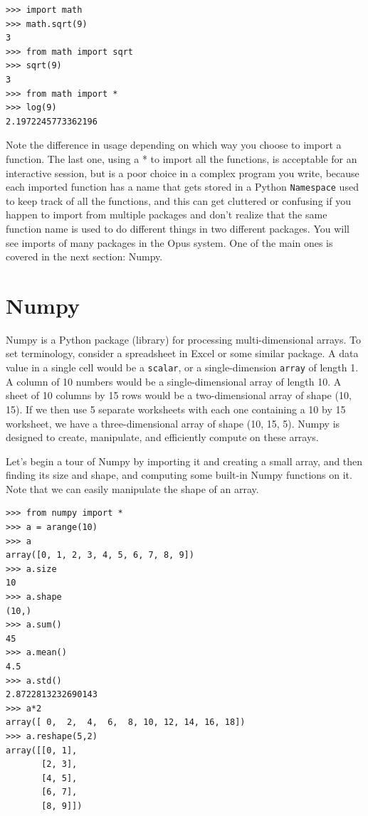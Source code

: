 \begin{lstlisting}
>>> import math
>>> math.sqrt(9)
3
>>> from math import sqrt
>>> sqrt(9)
3
>>> from math import *
>>> log(9)
2.1972245773362196
\end{lstlisting}

Note the difference in usage depending on which way you choose to import a function.  The last one, using a * to import all the functions, is acceptable for an interactive session, but is a poor choice in a complex program you write, because each imported function has a name that gets stored in a Python \verb#Namespace# used to keep track of all the functions, and this can get cluttered or confusing if you happen to import from multiple packages and don't realize that the same function name is used to do different things in two different packages. You will see imports of many packages in the Opus system.  One of the main ones is covered in the next section: Numpy.


\section{Numpy}
\label{appendix:numpy}

Numpy is a Python package (library) for processing multi-dimensional arrays.  To set terminology, consider a spreadsheet in Excel or some similar package.  A data value in a single cell would be a \verb#scalar#, or a single-dimension \verb#array# of length 1.  A column of 10 numbers would be a single-dimensional array of length 10.  A sheet of 10 columns by 15 rows would be a two-dimensional array of shape (10, 15).  If we then use 5 separate worksheets with each one containing a 10 by 15 worksheet, we have a three-dimensional array of shape (10, 15, 5).  Numpy is designed to create, manipulate, and efficiently compute on these arrays.

Let's begin a tour of Numpy by importing it and creating a small array,  and then finding its size and shape, and computing some built-in Numpy functions on it. Note that we can easily manipulate the shape of an array.

\begin{lstlisting}
>>> from numpy import *
>>> a = arange(10)
>>> a
array([0, 1, 2, 3, 4, 5, 6, 7, 8, 9])
>>> a.size
10
>>> a.shape
(10,)
>>> a.sum()
45
>>> a.mean()
4.5
>>> a.std()
2.8722813232690143
>>> a*2
array([ 0,  2,  4,  6,  8, 10, 12, 14, 16, 18])
>>> a.reshape(5,2)
array([[0, 1],
       [2, 3],
       [4, 5],
       [6, 7],
       [8, 9]])
\end{lstlisting}

